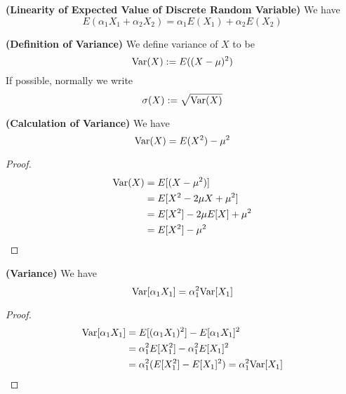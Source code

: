\documentclass{report}
\begin{document}
\begin{theorem}
\label{2.1.6}
\textbf{(Linearity of Expected Value of Discrete Random Variable)} We have
\begin{equation}
E(\alpha _1 X_1 +\alpha_2 X_2)=\alpha_1 E(X_1)+\alpha _2 E(X_2)
\end{equation}
\end{theorem}
\begin{definition}
\label{2.1.7}
\textbf{(Definition of Variance)} We define variance of $X$ to be
\begin{equation}
\text{Var} (X):=E((X-\mu)^2)
\end{equation}
If possible, normally we write
\begin{equation}
  \sigma(X):=\sqrt{\text{Var} (X)}
\end{equation}
\end{definition}
\begin{theorem}
\label{2.1.8}
\textbf{(Calculation of Variance)} We have
\begin{equation}
\text{Var} (X)=E(X^2)-\mu^2
\end{equation}
\end{theorem}
\begin{proof}
\begin{align}
\text{Var} (X)&=E[(X-\mu^2)]\\
&=E[X^2-2\mu X +\mu^2]\\
&=E[X^2]-2\mu E[X]+\mu^2\\
&=E[X^2]-\mu^2
\end{align}
\end{proof}
\begin{theorem}
\textbf{(Variance)} We have
\begin{equation}
\text{Var} [\alpha_1 X_1]=\alpha _1^2\text{Var} [X_1]
\end{equation}
\end{theorem}
\begin{proof}
\begin{align}
\text{Var} [\alpha _1 X_1]&=E[(\alpha _1X_1)^2]-E[\alpha _1X_1]^2\\
&=\alpha _1^2E[X_1^2]-\alpha _1^2E[X_1]^2\\
&=\alpha _1^2 (E[X_1^2]-E[X_1]^2)=\alpha _1^2 \text{Var} [X_1]
\end{align}
\end{proof}
\end{document}
